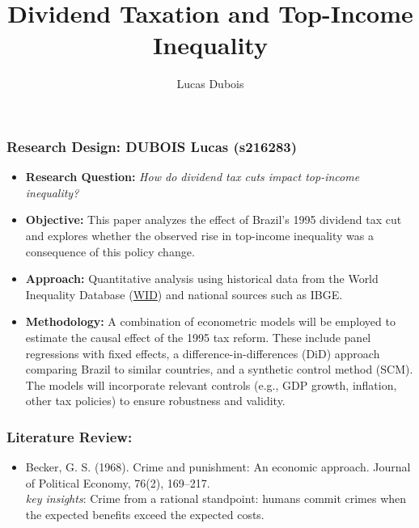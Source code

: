 \documentclass{beamer}
\title{\LARGE Dividend Taxation and Top-Income Inequality}
\author{Lucas Dubois}
\institute{HEC Liège}
\date{}
\begin{document}
\begin{frame}
    \titlepage
\end{frame}

\begin{frame}
    \frametitle{\Large{Research Design:} DUBOIS Lucas (s216283)}
    \begin{itemize}
        \item \textbf{Research Question:} \textit{How do dividend tax cuts impact top-income inequality?}
        \item \textbf{Objective:} This paper analyzes the effect of Brazil’s 1995 dividend tax cut and explores whether the observed rise in top-income inequality was a consequence of this policy change.
        \item \textbf{Approach:} Quantitative analysis using historical data from the World Inequality Database (\href{https://wid.world/country/brazil/}{WID}) and national sources such as IBGE.
        \item \textbf{Methodology:} A combination of econometric models will be employed to estimate the causal effect of the 1995 tax reform. These include panel regressions with fixed effects, a difference-in-differences (DiD) approach comparing Brazil to similar countries, and a synthetic control method (SCM). The models will incorporate relevant controls (e.g., GDP growth, inflation, other tax policies) to ensure robustness and validity.
    \end{itemize}
\end{frame}

\begin{frame}
    \frametitle{\LARGE Literature Review:}
    \begin{itemize}
        \item Becker, G. S. (1968). Crime and punishment: An economic approach. Journal of Political Economy, 76(2), 169–217.
        \\\vspace{0.1cm}
        \hspace{0.5cm}\textit{key insights}: Crime from a rational standpoint: humans commit crimes when the expected benefits exceed the expected costs.
    \end{itemize}
\end{frame}
\end{document}
